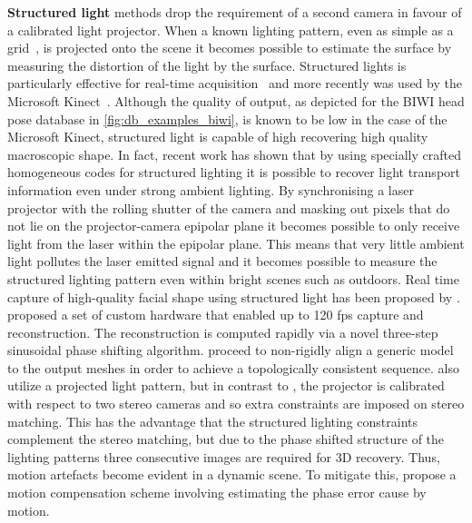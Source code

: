 \textbf{Structured light} methods drop the requirement of a second camera in
favour of a calibrated light projector. When a known lighting pattern, even as
simple as a grid~\cite{will1971grid}, is projected onto the scene it becomes
possible to estimate the surface by measuring the distortion of the light by the
surface. Structured lights is particularly effective for real-time
acquisition~\cite{rusinkiewicz2002real} and more recently was used by the
Microsoft Kinect~\cite{zhang2012microsoft}. Although the quality of output, as
depicted for the BIWI head pose database in
\cref{fig:db_examples_biwi}, is known to be low in the case of the Microsoft
Kinect, structured light is capable of high recovering high quality macroscopic
shape. In fact, recent work has shown that by using specially crafted 
homogeneous codes for structured lighting it is possible to recover light 
transport information even under strong ambient lighting. 
By synchronising a laser projector with the rolling shutter of the camera and
masking out pixels that do not lie on the projector-camera epipolar plane it 
becomes possible to only receive light from the laser within the epipolar plane.
This means that very little ambient light pollutes the laser emitted
signal and it becomes possible to measure the structured lighting pattern
even within bright scenes such as outdoors.
Real time capture of high-quality facial shape using
structured light has been proposed by \citet{zhang2006high,weise2007fast}. 
\citet{zhang2006high,wang2004high} proposed a set of custom hardware that
enabled up to 120 fps capture and reconstruction. The reconstruction is computed
rapidly via a novel three-step sinusoidal phase shifting algorithm.
\citet{zhang2006high} proceed to non-rigidly align a generic model to the output
meshes in order to achieve a topologically consistent sequence.
\citet{weise2007fast} also utilize a projected light pattern, but in contrast to
\citet{zhang2006high}, the projector is calibrated with respect to two stereo
cameras and so extra constraints are imposed on stereo matching. This has the
advantage that the structured lighting constraints complement the stereo
matching, but due to the phase shifted structure of the lighting patterns three
consecutive images are required for 3D recovery. Thus, motion artefacts become
evident in a dynamic scene. To mitigate this, \citet{weise2007fast} propose a
motion compensation scheme involving estimating the phase error cause by motion.

